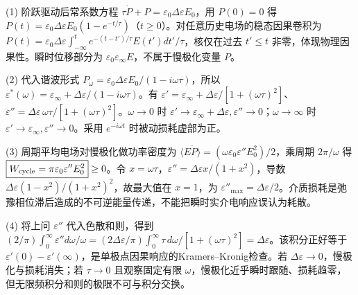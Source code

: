 (1) 阶跃驱动后常系数方程 \(\tau\dot P+P=\varepsilon_0\Delta\varepsilon E_0\)，用 \(P(0)=0\) 得 \(\boxed{P(t)=\varepsilon_0\Delta\varepsilon E_0(1-e^{-t/\tau})}\)（\(t\ge0\)）。对任意历史电场的稳态因果卷积为 \(P(t)=\varepsilon_0\Delta\varepsilon\int_{-\infty}^t e^{-(t-t')/\tau}E(t')dt'/\tau\)，核仅在过去 \(t'\le t\) 非零，体现物理因果性。瞬时位移部分为 \(\varepsilon_0\varepsilon_\infty E\)，不属于慢极化变量 \(P\)。

(2) 代入谐波形式 \(P_\omega=\varepsilon_0\Delta\varepsilon E_0/(1-i\omega\tau)\)，所以 \(\boxed{\varepsilon^*(\omega)=\varepsilon_\infty+\Delta\varepsilon/(1-i\omega\tau)}\)。有 \(\varepsilon'=\varepsilon_\infty+\Delta\varepsilon/[1+(\omega\tau)^2]\)、\(\varepsilon''=\Delta\varepsilon\,\omega\tau/[1+(\omega\tau)^2]\)。\(\omega\to0\) 时 \(\varepsilon'\to\varepsilon_\infty+\Delta\varepsilon,\varepsilon''\to0\)；\(\omega\to\infty\) 时 \(\varepsilon'\to\varepsilon_\infty,\varepsilon''\to0\)。采用 \(e^{-i\omega t}\) 时被动损耗虚部为正。

(3) 周期平均电场对慢极化做功率密度为 \(\langle E\dot P\rangle=(\omega\varepsilon_0\varepsilon''E_0^2)/2\)，乘周期 \(2\pi/\omega\) 得 \(\boxed{W_{\rm cycle}=\pi\varepsilon_0\varepsilon''E_0^2}\ge0\)。令 \(x=\omega\tau\)，\(\varepsilon''=\Delta\varepsilon x/(1+x^2)\)，导数 \(\Delta\varepsilon(1-x^2)/(1+x^2)^2\)，故最大值在 \(x=1\)，为 \(\boxed{\varepsilon''_{\max}=\Delta\varepsilon/2}\)。介质损耗是弛豫相位滞后造成的不可逆能量传递，不能把瞬时实介电响应误认为耗散。

(4) 将上问 \(\varepsilon''\) 代入色散和则，得到 \((2/\pi)\int_0^\infty\varepsilon''d\omega/\omega=(2\Delta\varepsilon/\pi)\int_0^\infty\tau\,d\omega/[1+(\omega\tau)^2]=\Delta\varepsilon\)。该积分正好等于 \(\varepsilon'(0)-\varepsilon'(\infty)\)，是单极点因果响应的Kramers–Kronig检查。若 \(\Delta\varepsilon\to0\)，慢极化与损耗消失；若 \(\tau\to0\) 且观察固定有限 \(\omega\)，慢极化近乎瞬时跟随、损耗趋零，但无限频积分和则的极限不可与积分交换。
